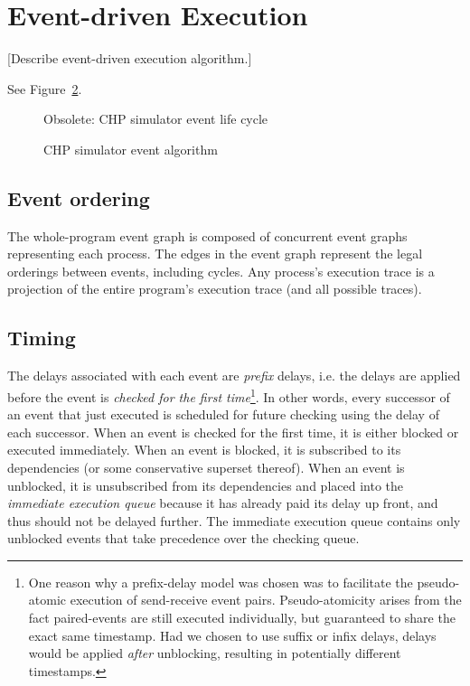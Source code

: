 
\section{Event-driven Execution}
\label{sec:exec}

[Describe event-driven execution algorithm.]

See Figure~\ref{fig:event_algo}.

\begin{figure}[ht!]
\begin{center}
\caption{Obsolete: CHP simulator event life cycle}
\label{fig:event_exec}
\end{center}
\end{figure}

\begin{figure}[ht!]
\begin{center}
\caption{CHP simulator event algorithm}
\label{fig:event_algo}
\end{center}
\end{figure}

\subsection{Event ordering}
\label{sec:exec:order}

The whole-program event graph is composed of concurrent event graphs
representing each process.  
The edges in the event graph represent the legal orderings between events, 
including cycles.  
Any process's execution trace is a projection of the entire program's
execution trace (and all possible traces).  

\subsection{Timing}
\label{sec:exec:timing}

The delays associated with each event are \emph{prefix} delays, 
i.e. the delays are applied before the event is 
\emph{checked for the first time}\footnote{One reason why 
a prefix-delay model was chosen was to facilitate
the pseudo-atomic execution of send-receive event pairs.
Pseudo-atomicity arises from the fact paired-events are still executed 
individually, but guaranteed to share the exact same timestamp.
Had we chosen to use suffix or infix delays, delays would be applied
\emph{after} unblocking, resulting in potentially different timestamps.}.
In other words, every successor of an event that just executed
is scheduled for future checking using the delay of each successor.  
When an event is checked for the first time, it is either blocked
or executed immediately.  
When an event is blocked, it is subscribed to its dependencies
(or some conservative superset thereof).  
When an event is unblocked, it is unsubscribed from its dependencies
and placed into the \emph{immediate execution queue} because
it has already paid its delay up front, 
and thus should not be delayed further.  
The immediate execution queue contains only unblocked events
that take precedence over the checking queue.  


